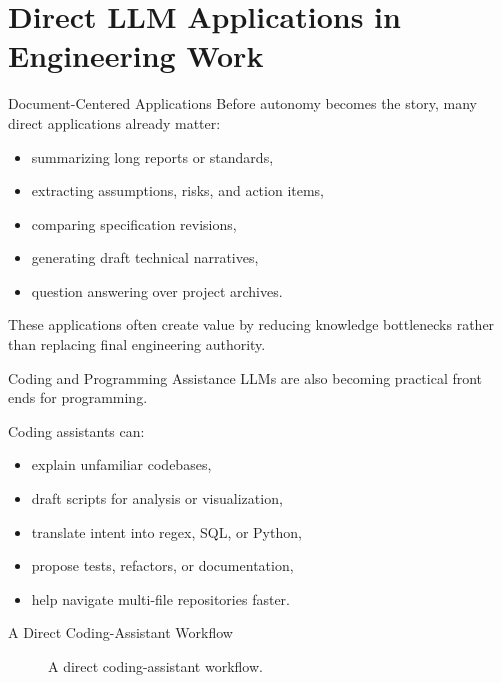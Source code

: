 \documentclass[12pt]{beamer}
\begin{document}
\section{Direct LLM Applications in Engineering Work}

\begin{frame}{Document-Centered Applications}
  Before autonomy becomes the story, many direct applications already matter:
  \begin{itemize}
    \item summarizing long reports or standards,
    \item extracting assumptions, risks, and action items,
    \item comparing specification revisions,
    \item generating draft technical narratives,
    \item question answering over project archives.
  \end{itemize}

  These applications often create value by reducing knowledge bottlenecks rather than replacing final engineering authority.
\end{frame}

\begin{frame}{Coding and Programming Assistance}
  LLMs are also becoming practical front ends for programming.

  Coding assistants can:
  \begin{itemize}
    \item explain unfamiliar codebases,
    \item draft scripts for analysis or visualization,
    \item translate intent into regex, SQL, or Python,
    \item propose tests, refactors, or documentation,
    \item help navigate multi-file repositories faster.
  \end{itemize}
\end{frame}

\begin{frame}{A Direct Coding-Assistant Workflow}
  \begin{figure}
    \centering
    \caption{A direct coding-assistant workflow.}
  \end{figure}
\end{frame}
\end{document}

